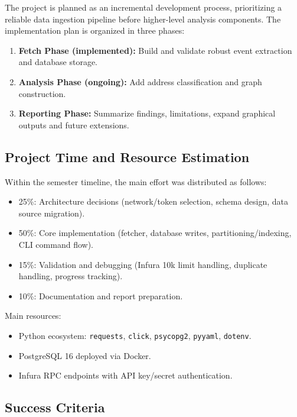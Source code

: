 \documentclass[a4paper,12pt]{report}
\begin{document}
The project is planned as an incremental development process, prioritizing a reliable data ingestion pipeline before higher-level analysis components. The implementation plan is organized in three phases:

\begin{enumerate}
\item \textbf{Fetch Phase (implemented):} Build and validate robust event extraction and database storage.
\item \textbf{Analysis Phase (ongoing):} Add address classification and graph construction.
\item \textbf{Reporting Phase:} Summarize findings, limitations, expand graphical outputs and future extensions.
\end{enumerate}

\subsection{Project Time and Resource Estimation}

Within the semester timeline, the main effort was distributed as follows:

\begin{itemize}
\item 25\%: Architecture decisions (network/token selection, schema design, data source migration).
\item 50\%: Core implementation (fetcher, database writes, partitioning/indexing, CLI command flow).
\item 15\%: Validation and debugging (Infura 10k limit handling, duplicate handling, progress tracking).
\item 10\%: Documentation and report preparation.
\end{itemize}

Main resources:

\begin{itemize}
\item Python ecosystem: \texttt{requests}, \texttt{click}, \texttt{psycopg2}, \texttt{pyyaml}, \texttt{dotenv}.
\item PostgreSQL 16 deployed via Docker.
\item Infura RPC endpoints with API key/secret authentication.
\end{itemize}

\subsection{Success Criteria}
\end{document}
